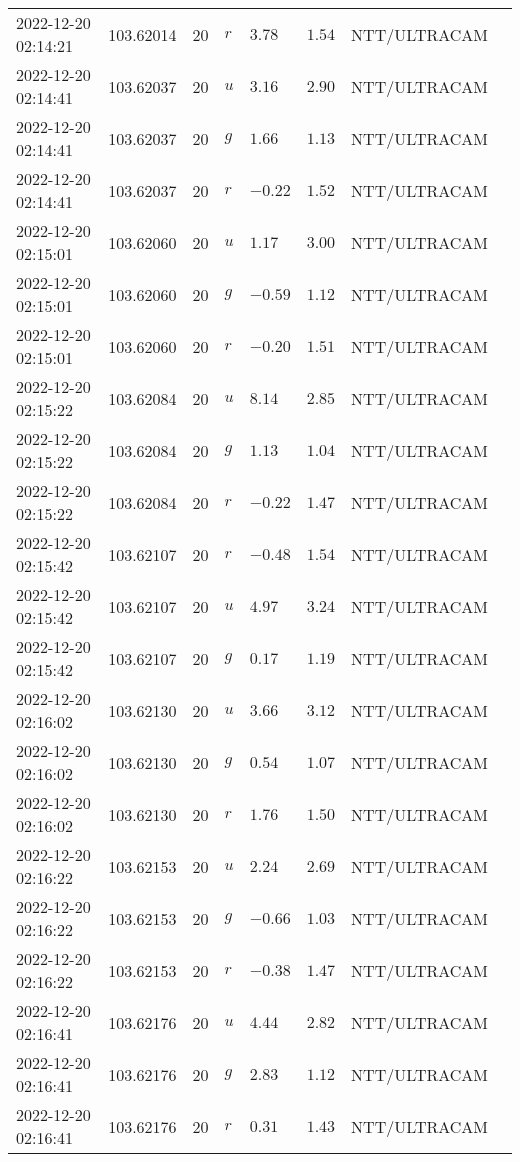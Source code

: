 \documentclass{nature_plusfigure}
\begin{document}
\begin{supplement}
\begin{center}
\begin{longtable}{llllllll}
2022-12-20 02:14:21 & 103.62014 & 20 & $r$ & $3.78$ & $1.54$ & NTT/ULTRACAM &  \\ 
2022-12-20 02:14:41 & 103.62037 & 20 & $u$ & $3.16$ & $2.90$ & NTT/ULTRACAM &  \\ 
2022-12-20 02:14:41 & 103.62037 & 20 & $g$ & $1.66$ & $1.13$ & NTT/ULTRACAM &  \\ 
2022-12-20 02:14:41 & 103.62037 & 20 & $r$ & $-0.22$ & $1.52$ & NTT/ULTRACAM &  \\ 
2022-12-20 02:15:01 & 103.62060 & 20 & $u$ & $1.17$ & $3.00$ & NTT/ULTRACAM &  \\ 
2022-12-20 02:15:01 & 103.62060 & 20 & $g$ & $-0.59$ & $1.12$ & NTT/ULTRACAM &  \\ 
2022-12-20 02:15:01 & 103.62060 & 20 & $r$ & $-0.20$ & $1.51$ & NTT/ULTRACAM &  \\ 
2022-12-20 02:15:22 & 103.62084 & 20 & $u$ & $8.14$ & $2.85$ & NTT/ULTRACAM &  \\ 
2022-12-20 02:15:22 & 103.62084 & 20 & $g$ & $1.13$ & $1.04$ & NTT/ULTRACAM &  \\ 
2022-12-20 02:15:22 & 103.62084 & 20 & $r$ & $-0.22$ & $1.47$ & NTT/ULTRACAM &  \\ 
2022-12-20 02:15:42 & 103.62107 & 20 & $r$ & $-0.48$ & $1.54$ & NTT/ULTRACAM &  \\ 
2022-12-20 02:15:42 & 103.62107 & 20 & $u$ & $4.97$ & $3.24$ & NTT/ULTRACAM &  \\ 
2022-12-20 02:15:42 & 103.62107 & 20 & $g$ & $0.17$ & $1.19$ & NTT/ULTRACAM &  \\ 
2022-12-20 02:16:02 & 103.62130 & 20 & $u$ & $3.66$ & $3.12$ & NTT/ULTRACAM &  \\ 
2022-12-20 02:16:02 & 103.62130 & 20 & $g$ & $0.54$ & $1.07$ & NTT/ULTRACAM &  \\ 
2022-12-20 02:16:02 & 103.62130 & 20 & $r$ & $1.76$ & $1.50$ & NTT/ULTRACAM &  \\ 
2022-12-20 02:16:22 & 103.62153 & 20 & $u$ & $2.24$ & $2.69$ & NTT/ULTRACAM &  \\ 
2022-12-20 02:16:22 & 103.62153 & 20 & $g$ & $-0.66$ & $1.03$ & NTT/ULTRACAM &  \\ 
2022-12-20 02:16:22 & 103.62153 & 20 & $r$ & $-0.38$ & $1.47$ & NTT/ULTRACAM &  \\ 
2022-12-20 02:16:41 & 103.62176 & 20 & $u$ & $4.44$ & $2.82$ & NTT/ULTRACAM &  \\ 
2022-12-20 02:16:41 & 103.62176 & 20 & $g$ & $2.83$ & $1.12$ & NTT/ULTRACAM &  \\ 
2022-12-20 02:16:41 & 103.62176 & 20 & $r$ & $0.31$ & $1.43$ & NTT/ULTRACAM &  \\ 

\end{longtable}
\end{center}
\end{supplement}
\end{document}
